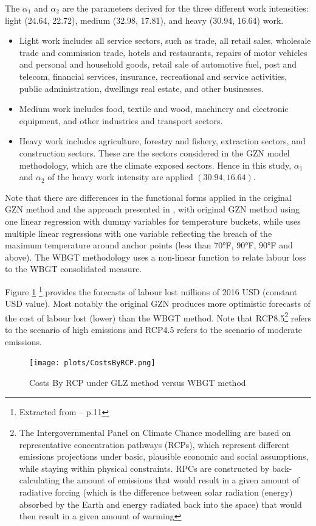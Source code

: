\documentclass[a4paper,11pt]{extarticle} %
\theoremstyle{definition}
\begin{document}
The $\alpha_1$ and $\alpha_2$ are the parameters derived for the three different work intensities: light (24.64, 22.72), medium (32.98, 17.81), and heavy (30.94, 16.64) work.
\begin{itemize}
    \item Light work includes all service sectors, such as trade, all retail sales, wholesale trade and commission trade, hotels and restaurants, repairs of motor vehicles and personal and household goods, retail sale of automotive fuel, post and telecom, financial services, insurance, recreational and service activities, public administration, dwellings real estate, and other businesses.
    \item Medium work includes food, textile and wood, machinery and electronic equipment, and other industries and transport sectors.
    \item Heavy work includes agriculture, forestry and fishery, extraction sectors, and construction sectors. These are the sectors considered in the GZN model methodology, which are the climate exposed sectors. Hence in this study, $\alpha_1$ and $\alpha_2$ of the heavy work intensity are applied $(30.94, 16.64)$.
\end{itemize}

Note that there are differences in the functional forms applied in the original GZN method \cite{NeidellEtAl:2014} and the approach presented in \cite{NeidellEtAl:2021}, with original GZN method using one linear regression with dummy variables for temperature buckets, while \cite{NeidellEtAl:2021} uses multiple linear regressions with one variable reflecting the breach of the maximum temperature around anchor points (less than $70$°F, $90$°F, $90$°F and above). The WBGT methodology uses a non-linear function to relate labour loss to the WBGT consolidated measure.

Figure \ref{fig:CostsByRCP} \footnote{Extracted from \cite{ZhangAndShindell:2021} -- p.11} provides the forecasts of labour lost millions of 2016 USD (constant USD value). Most notably the original GZN produces more optimistic forecasts of the cost of labour lost (lower) than the WBGT method. Note that RCP8.5\footnote{The Intergovernmental Panel on Climate Chance modelling are based on representative concentration pathways (RCPs), which represent different emissions projections under basic, plausible economic and social assumptions, while staying within physical constraints. RPCs are constructed by back-calculating the amount of emissions that would result in a given amount of radiative forcing (which is the difference between solar radiation (energy) absorbed by the Earth and energy radiated back into the space) that would then result in a given amount of warming} refers to the scenario of high emissions and RCP4.5 refers to the scenario of moderate emissions.
\begin{figure}[h]
    \centering
    \texttt{[image: plots/CostsByRCP.png]}
    \caption{Costs By RCP under GLZ method versus WBGT method}
    \label{fig:CostsByRCP}
\end{figure}
\end{document}
